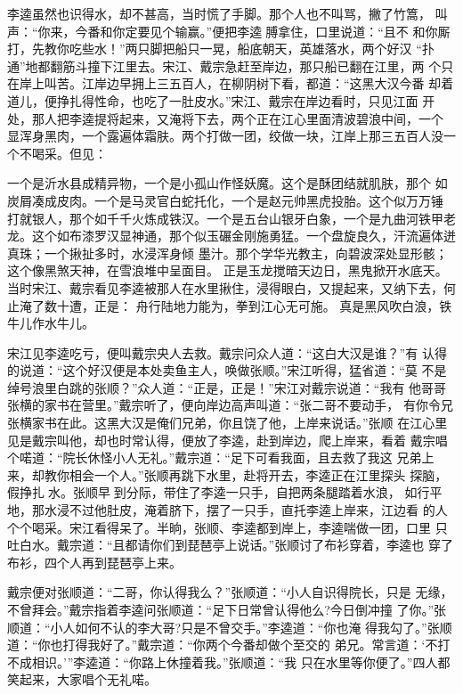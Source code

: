 李逵虽然也识得水，却不甚高，当时慌了手脚。那个人也不叫骂，撇了竹篙，
叫声：“你来，今番和你定要见个输赢。”便把李逵膊拿住，口里说道：“且不
和你厮打，先教你吃些水！”两只脚把船只一晃，船底朝天，英雄落水，两个好汉
“扑通”地都翻筋斗撞下江里去。宋江、戴宗急赶至岸边，那只船已翻在江里，两
个只在岸上叫苦。江岸边早拥上三五百人，在柳阴树下看，都道：“这黑大汉今番
却着道儿，便挣扎得性命，也吃了一肚皮水。”宋江、戴宗在岸边看时，只见江面
开处，那人把李逵提将起来，又淹将下去，两个正在江心里面清波碧浪中间，一个
显浑身黑肉，一个露遍体霜肤。两个打做一团，绞做一块，江岸上那三五百人没一
个不喝采。但见：

一个是沂水县成精异物，一个是小孤山作怪妖魔。这个是酥团结就肌肤，那个
如炭屑凑成皮肉。一个是马灵官白蛇托化，一个是赵元帅黑虎投胎。这个似万万锤
打就银人，那个如千千火炼成铁汉。一个是五台山银牙白象，一个是九曲河铁甲老
龙。这个如布漆罗汉显神通，那个似玉碾金刚施勇猛。一个盘旋良久，汗流遍体迸
真珠；一个揪扯多时，水浸浑身倾
墨汁。那个学华光教主，向碧波深处显形骸；这个像黑煞天神，在雪浪堆中呈面目。
正是玉龙搅暗天边日，黑鬼掀开水底天。
当时宋江、戴宗看见李逵被那人在水里揪住，浸得眼白，又提起来，又纳下去，何
止淹了数十遭，正是：
舟行陆地力能为，拳到江心无可施。
真是黑风吹白浪，铁牛儿作水牛儿。

宋江见李逵吃亏，便叫戴宗央人去救。戴宗问众人道：“这白大汉是谁？”有
认得的说道：“这个好汉便是本处卖鱼主人，唤做张顺。”宋江听得，猛省道：“莫
不是绰号浪里白跳的张顺？”众人道：“正是，正是！”宋江对戴宗说道：“我有
他哥哥张横的家书在营里。”戴宗听了，便向岸边高声叫道：“张二哥不要动手，
有你令兄张横家书在此。这黑大汉是俺们兄弟，你且饶了他，上岸来说话。”张顺
在江心里见是戴宗叫他，却也时常认得，便放了李逵，赴到岸边，爬上岸来，看着
戴宗唱个喏道：“院长休怪小人无礼。”戴宗道：“足下可看我面，且去救了我这
兄弟上来，却教你相会一个人。”张顺再跳下水里，赴将开去，李逵正在江里探头
探脑，假挣扎水。张顺早到分际，带住了李逵一只手，自把两条腿踏着水浪，
如行平地，那水浸不过他肚皮，淹着脐下，摆了一只手，直托李逵上岸来，江边看
的人个个喝采。宋江看得呆了。半晌，张顺、李逵都到岸上，李逵喘做一团，口里
只吐白水。戴宗道：“且都请你们到琵琶亭上说话。”张顺讨了布衫穿着，李逵也
穿了布衫，四个人再到琵琶亭上来。

戴宗便对张顺道：“二哥，你认得我么？”张顺道：“小人自识得院长，只是
无缘，不曾拜会。”戴宗指着李逵问张顺道：“足下日常曾认得他么?今日倒冲撞
了你。”张顺道：“小人如何不认的李大哥?只是不曾交手。”李逵道：“你也淹
得我勾了。”张顺道：“你也打得我好了。”戴宗道：“你两个今番却做个至交的
弟兄。常言道：‘不打不成相识。’”李逵道：“你路上休撞着我。”张顺道：“我
只在水里等你便了。”四人都笑起来，大家唱个无礼喏。

